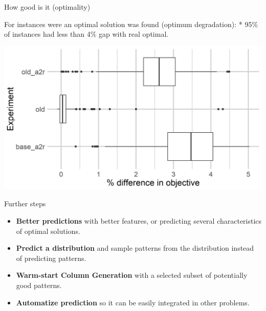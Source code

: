 \begin{frame}

\begin{block}{How good is it (optimality)}

For instances were an optimal solution was found (optimum degradation):
* 95\% of instances had less than 4\% gap with real optimal.

\includegraphics[width=0.8\linewidth]{quality_degradation_2tasks}

\end{block}

\end{frame}

\begin{frame}{Further steps}
\protect\hypertarget{further-steps}{}

\begin{itemize}[<+->]

\item
  \textbf{Better predictions} with better features, or predicting
  several characteristics of optimal solutions.
\item
  \textbf{Predict a distribution} and sample patterns from the
  distribution instead of predicting patterns.
\item
  \textbf{Warm-start Column Generation} with a selected subset of
  potentially good patterns.
\item
  \textbf{Automatize prediction} so it can be easily integrated in other
  problems.
\end{itemize}

\end{frame}
